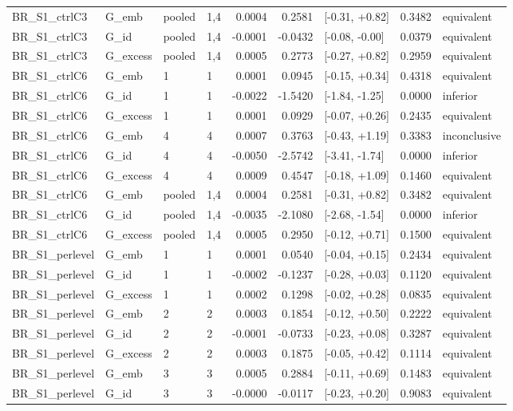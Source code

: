 \begin{tabular}{llllrrlrl}
BR\_S1\_ctrlC3 & G\_emb & pooled & 1,4 & 0.0004 & 0.2581 & [-0.31, +0.82] & 0.3482 & equivalent \\
BR\_S1\_ctrlC3 & G\_id & pooled & 1,4 & -0.0001 & -0.0432 & [-0.08, -0.00] & 0.0379 & equivalent \\
BR\_S1\_ctrlC3 & G\_excess & pooled & 1,4 & 0.0005 & 0.2773 & [-0.27, +0.82] & 0.2959 & equivalent \\
BR\_S1\_ctrlC6 & G\_emb & 1 & 1 & 0.0001 & 0.0945 & [-0.15, +0.34] & 0.4318 & equivalent \\
BR\_S1\_ctrlC6 & G\_id & 1 & 1 & -0.0022 & -1.5420 & [-1.84, -1.25] & 0.0000 & inferior \\
BR\_S1\_ctrlC6 & G\_excess & 1 & 1 & 0.0001 & 0.0929 & [-0.07, +0.26] & 0.2435 & equivalent \\
BR\_S1\_ctrlC6 & G\_emb & 4 & 4 & 0.0007 & 0.3763 & [-0.43, +1.19] & 0.3383 & inconclusive \\
BR\_S1\_ctrlC6 & G\_id & 4 & 4 & -0.0050 & -2.5742 & [-3.41, -1.74] & 0.0000 & inferior \\
BR\_S1\_ctrlC6 & G\_excess & 4 & 4 & 0.0009 & 0.4547 & [-0.18, +1.09] & 0.1460 & equivalent \\
BR\_S1\_ctrlC6 & G\_emb & pooled & 1,4 & 0.0004 & 0.2581 & [-0.31, +0.82] & 0.3482 & equivalent \\
BR\_S1\_ctrlC6 & G\_id & pooled & 1,4 & -0.0035 & -2.1080 & [-2.68, -1.54] & 0.0000 & inferior \\
BR\_S1\_ctrlC6 & G\_excess & pooled & 1,4 & 0.0005 & 0.2950 & [-0.12, +0.71] & 0.1500 & equivalent \\
BR\_S1\_perlevel & G\_emb & 1 & 1 & 0.0001 & 0.0540 & [-0.04, +0.15] & 0.2434 & equivalent \\
BR\_S1\_perlevel & G\_id & 1 & 1 & -0.0002 & -0.1237 & [-0.28, +0.03] & 0.1120 & equivalent \\
BR\_S1\_perlevel & G\_excess & 1 & 1 & 0.0002 & 0.1298 & [-0.02, +0.28] & 0.0835 & equivalent \\
BR\_S1\_perlevel & G\_emb & 2 & 2 & 0.0003 & 0.1854 & [-0.12, +0.50] & 0.2222 & equivalent \\
BR\_S1\_perlevel & G\_id & 2 & 2 & -0.0001 & -0.0733 & [-0.23, +0.08] & 0.3287 & equivalent \\
BR\_S1\_perlevel & G\_excess & 2 & 2 & 0.0003 & 0.1875 & [-0.05, +0.42] & 0.1114 & equivalent \\
BR\_S1\_perlevel & G\_emb & 3 & 3 & 0.0005 & 0.2884 & [-0.11, +0.69] & 0.1483 & equivalent \\
BR\_S1\_perlevel & G\_id & 3 & 3 & -0.0000 & -0.0117 & [-0.23, +0.20] & 0.9083 & equivalent \\

\end{tabular}
